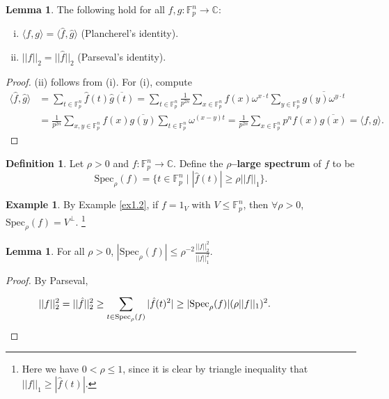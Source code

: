 \documentclass{article}
\theoremstyle{definition}
\newtheorem{lemma}[theorem]{Lemma}
\newtheorem{example}[theorem]{Example}
\newtheorem{defn}[theorem]{Definition}
\begin{document}
\begin{lemma}\label{lemma1.5}
    The following hold for all $f, g : \mathbb{F}_{p}^n \to \mathbb{C}$:
    \begin{enumerate}[(i)]
        \item $\langle f,g \rangle = \langle \hat{f}, \hat{g} \rangle$ (Plancherel's identity).
        \item $||f||_2 = ||\hat{f}||_2$ (Parseval's identity).
    \end{enumerate}
\end{lemma}
\begin{proof}
    (ii) follows from (i). For (i), compute
    \begin{align*}
        \langle \hat{f},\hat{g} \rangle &= \sum_{t \in \mathbb{F}_{p}^n}^{} \hat{f}(t)\overline{\hat{g}(t)} = \sum_{t \in \mathbb{F}_{p}^n}^{} \frac{1}{p^{2n}}\sum_{x \in \mathbb{F}_{p}^n}^{} f(x) \omega^{x \cdot t} \sum_{y \in \mathbb{F}_{p}^n}^{} \overline{g(y) \omega^{y\cdot t}}  \\
        &= \frac{1}{p^{2n}}\sum_{x,y \in \mathbb{F}_{p}^n}^{}  f(x)\overline{g(y)}\sum_{t \in \mathbb{F}_{p}^n}^{} \omega^{(x-y)t} = \frac{1}{p^{2n}}\sum_{x \in \mathbb{F}_{p}^n}^{} p^n f(x)\overline{g(x)} = \langle f,g \rangle.
    \end{align*}
    
\end{proof}
\begin{defn}\label{defn1.6}
    Let $\rho > 0$ and $f : \mathbb{F}_{p}^n \to \mathbb{C}$. Define the \textbf{$\rho$--large spectrum} of $f$ to be
    \[
    \text{Spec}_{\rho}(f) = \{t \in \mathbb{F}_{p}^n \mid |\hat{f}(t)| \ge \rho ||f||_1\}.
    \]
\end{defn}
\begin{example}
    By Example \ref{ex1.2}, if $f = 1_V$ with $V \le \mathbb{F}_{p}^n$, then $\forall \rho >0$, $\text{Spec}_{\rho}(f) = V^\perp$. \footnote{Here we have $0<\rho \le 1$, since it is clear by triangle inequality that $||f||_1 \ge |\hat{f}(t)|$.} 
\end{example}
\begin{lemma}\label{lemma1.8}
    For all $\rho > 0$, $|\text{Spec}_{\rho}(f)| \le \rho^{-2}\frac{||f||_2^2}{||f||_1^2}$.
\end{lemma}
\begin{proof}
    By Parseval,
    \begin{align*}
        ||f||_2^2 = ||\hat{f}||_2^2\ge \sum_{t \in \text{Spec}_{\rho}(f)}^{} |\hat{f}(t)^2| \ge |\text{Spec}_{\rho}(f)|(\rho ||f||_1)^2. ~~~~~~~~~~~~~~~~\qedhere
    \end{align*}
\end{proof}
\end{document}
